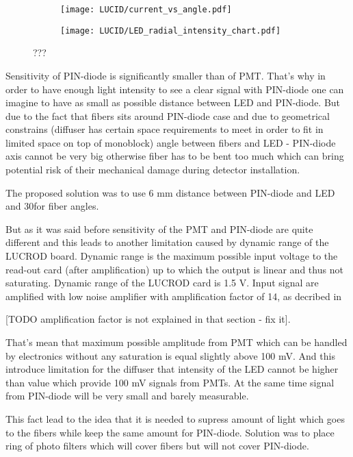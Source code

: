 \begin{figure}
\begin{subfigure}{.46\textwidth}
  \centering
  \texttt{[image: LUCID/current\_vs\_angle.pdf]}
\end{subfigure}
\begin{subfigure}{.51\textwidth}
  \centering
  \texttt{[image: LUCID/LED\_radial\_intensity\_chart.pdf]}
\end{subfigure}

\caption{???}
\label{fig:AngularDistributionOfLED}
\end{figure}

Sensitivity of PIN-diode is significantly smaller than of PMT.
That's why in order to have enough light intensity to see a clear signal with PIN-diode one can imagine to have as small as possible
distance between LED and PIN-diode. But due to the fact that fibers sits around PIN-diode case and due to geometrical constrains 
(diffuser has certain space requirements to meet in order to fit in limited space on top of monoblock) angle between fibers and LED - PIN-diode axis cannot be very big
otherwise fiber has to be bent too much which can bring potential risk of their mechanical damage during detector installation.

The proposed solution was to use 6 mm distance between PIN-diode and LED and 30\degree for fiber angles.

But as it was said before sensitivity of the PMT and PIN-diode are quite different and this leads to another limitation caused by dynamic range of the LUCROD board.
Dynamic range is the maximum possible input voltage to the read-out card (after amplification) up to which the output is linear and thus not saturating.
Dynamic range of the LUCROD card is 1.5 V. 
Input signal are amplified with low noise amplifier with amplification factor of 14, as decribed in  

[TODO amplification factor is not explained in that section  - fix it].

That's mean that maximum possible amplitude from PMT which can be handled by electronics without any saturation is equal slightly above 100 mV.
And this introduce limitation for the diffuser that intensity of the LED cannot be higher than value which provide 100 mV signals from PMTs.
At the same time signal from PIN-diode will be very small and barely measurable.

This fact lead to the idea that it is needed to supress amount of light which goes to the fibers while keep the same amount for PIN-diode.
Solution was to place ring of photo filters which will cover fibers but will not cover PIN-diode.


